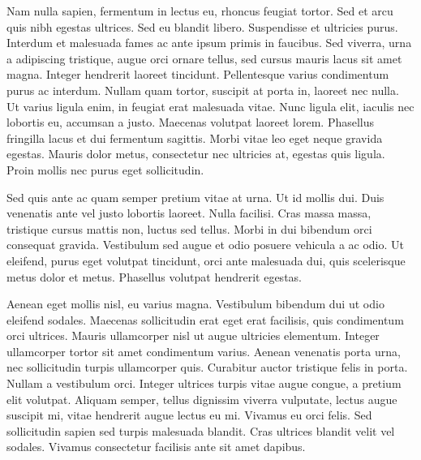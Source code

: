 Nam nulla sapien, fermentum in lectus eu, rhoncus feugiat tortor. Sed
et arcu quis nibh egestas ultrices. Sed eu blandit libero. Suspendisse
et ultricies purus. Interdum et malesuada fames ac ante ipsum primis
in faucibus. Sed viverra, urna a adipiscing tristique, augue orci
ornare tellus, sed cursus mauris lacus sit amet magna. Integer
hendrerit laoreet tincidunt. Pellentesque varius condimentum purus ac
interdum. Nullam quam tortor, suscipit at porta in, laoreet nec nulla.
Ut varius ligula enim, in feugiat erat malesuada vitae. Nunc ligula
elit, iaculis nec lobortis eu, accumsan a justo. Maecenas volutpat
laoreet lorem. Phasellus fringilla lacus et dui fermentum sagittis.
Morbi vitae leo eget neque gravida egestas. Mauris dolor metus,
consectetur nec ultricies at, egestas quis ligula. Proin mollis nec
purus eget sollicitudin.

Sed quis ante ac quam semper pretium vitae at urna. Ut id mollis dui.
Duis venenatis ante vel justo lobortis laoreet. Nulla facilisi. Cras
massa massa, tristique cursus mattis non, luctus sed tellus. Morbi in
dui bibendum orci consequat gravida. Vestibulum sed augue et odio
posuere vehicula a ac odio. Ut eleifend, purus eget volutpat
tincidunt, orci ante malesuada dui, quis scelerisque metus dolor et
metus. Phasellus volutpat hendrerit egestas.

Aenean eget mollis nisl, eu varius magna. Vestibulum bibendum dui ut
odio eleifend sodales. Maecenas sollicitudin erat eget erat facilisis,
quis condimentum orci ultrices. Mauris ullamcorper nisl ut augue
ultricies elementum. Integer ullamcorper tortor sit amet condimentum
varius. Aenean venenatis porta urna, nec sollicitudin turpis
ullamcorper quis. Curabitur auctor tristique felis in porta. Nullam a
vestibulum orci. Integer ultrices turpis vitae augue congue, a pretium
elit volutpat. Aliquam semper, tellus dignissim viverra vulputate,
lectus augue suscipit mi, vitae hendrerit augue lectus eu mi. Vivamus
eu orci felis. Sed sollicitudin sapien sed turpis malesuada blandit.
Cras ultrices blandit velit vel sodales. Vivamus consectetur facilisis
ante sit amet dapibus.
